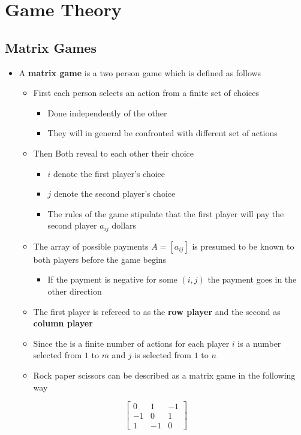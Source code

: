 \documentclass[11pt]{article}
\begin{document}
\section{Game Theory}
\label{sec:orgddc61b8}
\subsection{Matrix Games}
\label{sec:orgd46840e}
\begin{itemize}
\item A \textbf{matrix game} is a two person game which is defined as follows
\begin{itemize}
\item First each person selects an action from a finite set of choices 
\begin{itemize}
\item Done independently of the other
\item They will in general be confronted with different set of actions
\end{itemize}
\item Then Both reveal to each other their choice
\begin{itemize}
\item \(i\) denote the first player's choice
\item \(j\) denote the second player's choice
\item The rules of the game stipulate that the first player will pay the second player \(a_{ij}\) dollars
\end{itemize}
\item The array of possible payments \(A = [a_{ij}]\) is presumed to be known to both players before the game begins
\begin{itemize}
\item If the payment is negative for some \((i,j)\) the payment goes in the other direction
\end{itemize}
\item The first player is refereed to as the \textbf{row player} and the second as \textbf{column player}
\item Since the is a finite number of actions for each player \(i\) is a number selected from \(1\) to \(m\) and \(j\) is selected from \(1\) to \(n\)
\item Rock paper scissors can be described as a matrix game in the following way
\end{itemize}
\end{itemize}
\begin{equation}
  \begin{bmatrix} 
     0 &  1 & -1 \\ 
    -1 &  0 &  1 \\ 
     1 & -1 &  0 
  \end{bmatrix}
\end{equation}	
\end{document}
